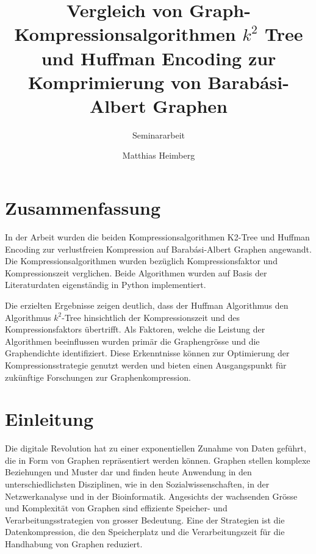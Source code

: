 \documentclass{ffhsthesis}
\begin{document}
\title{Vergleich von Graph-Kompressionsalgorithmen $k^{2}$ Tree und Huffman Encoding zur Komprimierung von Barabási-Albert Graphen}
\subtitle{Seminararbeit} %
\author{Matthias Heimberg}


\maketitle
\chapter*{Zusammenfassung}
In der Arbeit wurden die beiden Kompressionsalgorithmen K2-Tree und Huffman Encoding zur verlustfreien Kompression auf Barabási-Albert Graphen angewandt. Die Kompressionsalgorithmen wurden bezüglich Kompressionsfaktor und Kompressionszeit verglichen. Beide Algorithmen wurden auf Basis der Literaturdaten eigenständig in Python implementiert. 

Die erzielten Ergebnisse zeigen deutlich, dass der Huffman Algorithmus den Algorithmus $k^2$-Tree hinsichtlich der Kompressionszeit und des Kompressionsfaktors übertrifft. Als Faktoren, welche die Leistung der Algorithmen beeinflussen wurden primär die Graphengrösse und die Graphendichte identifiziert. Diese Erkenntnisse können zur Optimierung der Kompressionsstrategie genutzt werden und bieten einen Ausgangspunkt für zukünftige Forschungen zur Graphenkompression.

\tableofcontents


\startThesis %



\chapter{Einleitung} 

Die digitale Revolution hat zu einer exponentiellen Zunahme von Daten geführt, die in Form von Graphen repräsentiert werden können. Graphen stellen komplexe Beziehungen und Muster dar und finden heute Anwendung in den unterschiedlichsten Disziplinen, wie in den Sozialwissenschaften, in der Netzwerkanalyse und in der Bioinformatik. Angesichts der wachsenden Grösse und Komplexität von Graphen sind effiziente Speicher- und Verarbeitungsstrategien von grosser Bedeutung. Eine der Strategien ist die Datenkompression, die den Speicherplatz und die Verarbeitungszeit für die Handhabung von Graphen reduziert.
\end{document}
